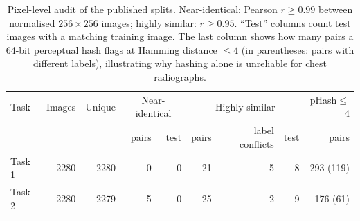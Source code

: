 \begin{table}[t]
\centering
\scriptsize
\caption{Pixel-level audit of the published splits. Near-identical: Pearson $r\geq0.99$ between normalised $256\times256$ images; highly similar: $r\geq0.95$. ``Test'' columns count test images with a matching training image. The last column shows how many pairs a 64-bit perceptual hash flags at Hamming distance $\leq4$ (in parentheses: pairs with different labels), illustrating why hashing alone is unreliable for chest radiographs.}
\label{tab:audit}
\begin{tabular}{lrrrrrrrr}
\toprule
Task & Images & Unique & \multicolumn{2}{c}{Near-identical} & \multicolumn{3}{c}{Highly similar} & pHash$\leq$4 \\
 & & & pairs & test & pairs & label conflicts & test & pairs\\
\midrule
Task 1 & 2280 & 2280 & 0 & 0 & 21 & 5 & 8 & 293 (119) \\
Task 2 & 2280 & 2279 & 5 & 0 & 25 & 2 & 9 & 176 (61) \\
\bottomrule
\end{tabular}
\end{table}
